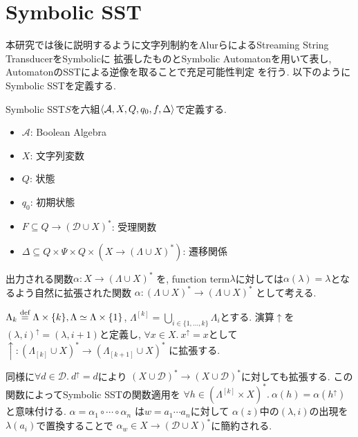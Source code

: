 \documentclass[uplatex,dvipdfmx,a4j]{jsreport}
\begin{document}
  \chapter{Symbolic SST}  \label{chap:symbolic_sst}
  本研究では後に説明するように文字列制約をAlurらによるStreaming String TransducerをSymbolicに
  拡張したものとSymbolic Automatonを用いて表し, AutomatonのSSTによる逆像を取ることで充足可能性判定
  を行う. 以下のようにSymbolic SSTを定義する.

  \begin{definition}

    Symbolic SST$S$を六組${\langle {\mathcal{A}, X, Q, q_0, f, \Delta} \rangle}$で定義する.
    \begin{itemize}
      \item $\mathcal{A}$: Boolean Algebra
      \item $X$: 文字列変数
      \item $Q$: 状態
      \item $q_0$: 初期状態
      \item $F \subseteq Q \rightarrow (\mathcal{D} \cup X)^*$: 受理関数
      \item $\Delta \subseteq Q \times \Psi \times
      Q \times (X \rightarrow (\Lambda \cup X)^*)$: 遷移関係
    \end{itemize}
    出力される関数$\alpha: X \rightarrow (\Lambda \cup X)^*$
    を, function term$\lambda$に対しては$\alpha(\lambda) = \lambda$となるよう自然に拡張された関数
    $\alpha: (\Lambda \cup X)^* \rightarrow (\Lambda \cup X)^*$
    として考える.

    $\Lambda_k \overset{\scriptsize \mbox{def}}{=} \Lambda \times \{ k \}, \Lambda \simeq \Lambda \times \{ 1 \}$,
    $\Lambda^{[k]} = \bigcup_{i \in \{ 1, \ldots, k \}} \Lambda_i$とする.
    演算$\uparrow$を$(\lambda, i)^\uparrow = (\lambda, i + 1)$と定義し,
    $\forall x \in X.\ x^\uparrow = x$として
    $\uparrow:(\Lambda_{[k]} \cup X)^* \rightarrow (\Lambda_{[k + 1]} \cup X)^*$
    に拡張する.

    同様に$\forall d \in \mathcal{D}.\ d^\uparrow = d$により
    $(X \cup \mathcal{D})^* \rightarrow (X \cup \mathcal{D})^*$に対しても拡張する.
    この関数によってSymbolic SSTの関数適用を
    $\forall h \in (\Lambda^{[k]} \times X)^*.\ \alpha(h) = \alpha(h^\uparrow)$
    と意味付ける.
    $\alpha = \alpha_1 \circ \cdots \circ \alpha_n$
    は$w = a_1 \cdots a_n$に対して
    $\alpha(z)$中の$(\lambda, i)$の出現を$\lambda(a_i)$で置換することで
    $\alpha_w \in X \rightarrow (\mathcal{D} \cup X)^*$に簡約される.


\end{definition}
\end{document}
